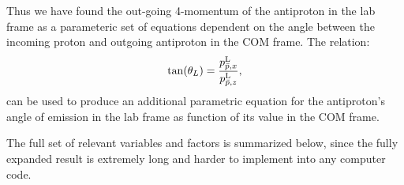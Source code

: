 Thus we have found the out-going 4-momentum of the antiproton in the lab frame as a parameteric set of equations dependent on the angle between the incoming proton and outgoing antiproton in the \ac{COM} frame.
The relation:
\begin{align}
\tan(\theta_L)=\frac{p^{\textrm{L}}_{\bar{p},x}}{p^{\textrm{L}}_{\bar{p},z}},
\end{align}
can be used to produce an additional parametric equation for the antiproton's angle of emission in the lab frame as function of its value in the COM frame.

The full set of relevant variables and factors is summarized below, since the fully expanded result is extremely long and harder to implement into any computer code.

%
